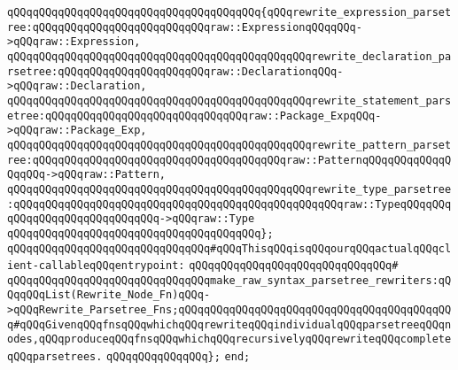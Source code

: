 \verb|qQQqqQQqqQQqqQQqqQQqqQQqqQQqqQQqqQQqqQQq{qQQqrewrite_expression_parsetree:qQQqqQQqqQQqqQQqqQQqqQQqqQQqraw::ExpressionqQQqqQQq->qQQqraw::Expression,|\newline
\verb|qQQqqQQqqQQqqQQqqQQqqQQqqQQqqQQqqQQqqQQqqQQqqQQqrewrite_declaration_parsetree:qQQqqQQqqQQqqQQqqQQqqQQqraw::DeclarationqQQq->qQQqraw::Declaration,|\newline
\verb|qQQqqQQqqQQqqQQqqQQqqQQqqQQqqQQqqQQqqQQqqQQqqQQqrewrite_statement_parsetree:qQQqqQQqqQQqqQQqqQQqqQQqqQQqqQQqraw::Package_ExpqQQq->qQQqraw::Package_Exp,|\newline
\verb|qQQqqQQqqQQqqQQqqQQqqQQqqQQqqQQqqQQqqQQqqQQqqQQqrewrite_pattern_parsetree:qQQqqQQqqQQqqQQqqQQqqQQqqQQqqQQqqQQqqQQqraw::PatternqQQqqQQqqQQqqQQqqQQq->qQQqraw::Pattern,|\newline
\verb|qQQqqQQqqQQqqQQqqQQqqQQqqQQqqQQqqQQqqQQqqQQqqQQqrewrite_type_parsetree:qQQqqQQqqQQqqQQqqQQqqQQqqQQqqQQqqQQqqQQqqQQqqQQqqQQqraw::TypeqQQqqQQqqQQqqQQqqQQqqQQqqQQqqQQq->qQQqraw::Type|\newline
\verb|qQQqqQQqqQQqqQQqqQQqqQQqqQQqqQQqqQQqqQQq};|\newline
\newline
\newline
\verb|qQQqqQQqqQQqqQQqqQQqqQQqqQQqqQQq#qQQqThisqQQqisqQQqourqQQqactualqQQqclient-callableqQQqentrypoint:|\newline
\verb|qQQqqQQqqQQqqQQqqQQqqQQqqQQqqQQq#|\newline
\verb|qQQqqQQqqQQqqQQqqQQqqQQqqQQqqQQqmake_raw_syntax_parsetree_rewriters:qQQqqQQqList(Rewrite_Node_Fn)qQQq->qQQqRewrite_Parsetree_Fns;qQQqqQQqqQQqqQQqqQQqqQQqqQQqqQQqqQQqqQQqqQQq#qQQqGivenqQQqfnsqQQqwhichqQQqrewriteqQQqindividualqQQqparsetreeqQQqnodes,qQQqproduceqQQqfnsqQQqwhichqQQqrecursivelyqQQqrewriteqQQqcompleteqQQqparsetrees.|\newline
\verb|qQQqqQQqqQQqqQQq};|\newline
\verb|end;|\newline

